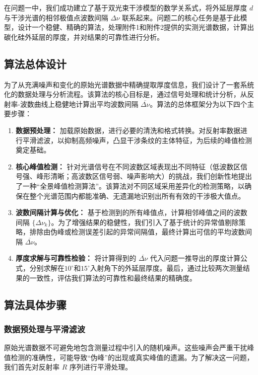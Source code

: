 \documentclass{ctexart} %
\begin{document}
在问题一中，我们成功建立了基于双光束干涉模型的数学关系式，将外延层厚度 $d$ 与干涉光谱的相邻极值点波数间隔 $\Delta\nu$ 联系起来。问题二的核心任务是基于此模型，设计一个稳健、精确的算法，处理附件1和附件2提供的实测光谱数据，计算出碳化硅外延层的厚度，并对结果的可靠性进行分析。

\subsection{算法总体设计}
为了从充满噪声和变化的原始光谱数据中精确提取厚度信息，我们设计了一套系统化的数据处理与分析流程。该算法的核心目标是，通过信号处理和统计分析，从反射率-波数曲线上稳健地计算出平均波数间隔 $\overline{\Delta\nu}$。算法的总体框架分为以下四个主要步骤：
\begin{enumerate}
    \item \textbf{数据预处理：} 加载原始数据，进行必要的清洗和格式转换。对反射率数据进行平滑滤波，以抑制高频噪声，凸显干涉条纹的主体特征，为后续的峰值检测奠定基础。
    \item \textbf{核心峰值检测：} 针对光谱信号在不同波数区域表现出不同特征（低波数区信号强、峰形清晰；高波数区信号弱、噪声影响大）的挑战，我们创新性地提出了一种“全景峰值检测算法”。该算法对不同区域采用差异化的检测策略，以确保在整个光谱范围内都能准确、无遗漏地识别出所有有效的干涉极大值点。
    \item \textbf{波数间隔计算与优化：} 基于检测到的所有峰值点，计算相邻峰值之间的波数间隔 $\{\Delta\nu_k\}$。为了增强结果的稳健性，我们引入了基于统计的异常值剔除策略，排除由伪峰或检测误差引起的异常间隔值，最终计算出可信的平均波数间隔 $\overline{\Delta\nu}$。
    \item \textbf{厚度求解与可靠性检验：} 将计算得到的 $\overline{\Delta\nu}$ 代入问题一推导出的厚度计算公式，分别求解在$10^\circ$和$15^\circ$入射角下的外延层厚度。最后，通过比较两次测量结果的一致性，评估我们算法的可靠性和最终结果的精确度。
\end{enumerate}

\subsection{算法具体步骤}

\subsubsection{数据预处理与平滑滤波}
原始光谱数据不可避免地包含测量过程中引入的随机噪声。这些噪声会严重干扰峰值检测的准确性，可能导致“伪峰”的出现或真实峰值的遗漏。为了解决这一问题，我们首先对反射率 $R$ 序列进行平滑处理。
\end{document}
